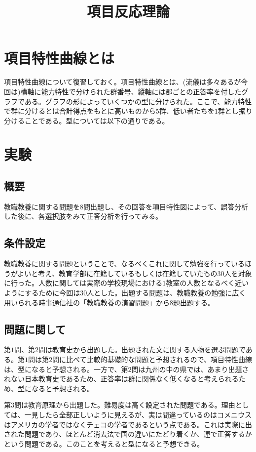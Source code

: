 \documentclass[12pt]{jarticle}
\title{項目反応理論}
\begin{document}
\maketitle
\section{項目特性曲線とは}
項目特性曲線について復習しておく。項目特性曲線とは、(流儀は多々あるが今回は)横軸に能力特性で分けられた群番号、縦軸には郡ごとの正答率を付したグラフである。グラフの形によっていくつかの型に分けられた。ここで、能力特性で群に分けるとは合計得点をもとに高いものから$5$群、低い者たちを$1$群とし振り分けることである。型については以下の通りである。%
\section{実験}
\subsection{概要}
教職教養に関する問題を$8$問出題し、その回答を項目特性図によって、誤答分析した後に、各選択肢をみて正答分析を行ってみる。
\subsection{条件設定}
教職教養に関する問題ということで、なるべくこれに関して勉強を行っているほうがよいと考え、教育学部に在籍しているもしくは在籍していたもの$30$人を対象に行った。人数に関しては実際の学校現場における$1$教室の人数となるべく近いようにするために今回は$30$人とした。出題する問題は、教職教養の勉強に広く用いられる時事通信社の「教職教養の演習問題」から$8$題出題する。
\subsection{問題に関して}
第$1$問、第$2$問は教育史から出題した。出題された文に関する人物を選ぶ問題である。第$1$問は第$2$問に比べて比較的基礎的な問題と予想されるので、項目特性曲線は、型になると予想される。一方で、第$2$問は九州の中の県では、あまり出題されない日本教育史であるため、正答率は群に関係なく低くなると考えられるため、型になると予想される。

第$3$問は教育原理から出題した。難易度は高く設定された問題である。理由としては、一見したら全部正しいように見えるが、実は間違っているのはコメニウスはアメリカの学者ではなくチェコの学者であるという点である。これは実際に出された問題であり、ほとんど消去法で国の違いにたどり着くか、運で正答するかという問題である。このことを考えると型になると予想できる。
\end{document}
